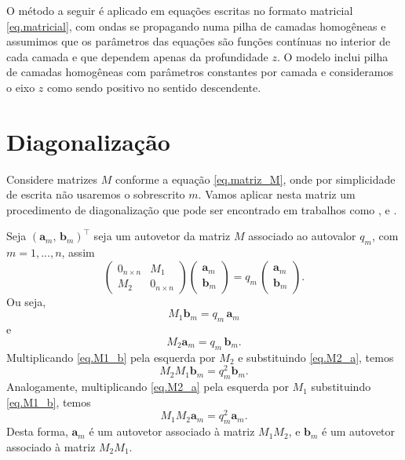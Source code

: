 O m\'etodo a seguir \'e aplicado em equa\c{c}\~oes escritas no formato matricial \ref{eq.matricial}, com ondas se propagando numa pilha de camadas homog\^eneas e assumimos que os par\^ametros das equa\c{c}\~oes s\~ao fun\c{c}\~oes cont\'inuas no interior de cada camada e que dependem apenas da profundidade $z$. O modelo inclui pilha de camadas homog\^eneas com par\^ametros constantes por camada e consideramos o eixo $z$ como sendo positivo no sentido descendente.

\section{Diagonaliza\c{c}\~ao}\label{sec.diagonalizacao}
Considere matrizes $M$ conforme a equa\c{c}\~ao \ref{eq.matriz_M}, onde por simplicidade de escrita n\~ao usaremos o sobrescrito $m$. Vamos aplicar nesta matriz um procedimento de diagonaliza\c{c}\~ao que pode ser encontrado em trabalhos como \cite{Ursin-1983}, \cite{White_Zhou_2006} e \cite{Azeredo_2013}.

Seja $(\mathbf{a}_m,\,\mathbf{b}_m)^\top$ seja um autovetor da matriz $M$ associado ao autovalor $q_m$, com $m=1,...,n$, assim
\begin{equation}
\begin{pmatrix}
0_{n\times n}&M_1\\
M_2&0_{n\times n}
\end{pmatrix}
\begin{pmatrix}
\mathbf{a}_m\\
\mathbf{b}_m
\end{pmatrix}
=
q_m\,
\begin{pmatrix}
\mathbf{a}_m\\
\mathbf{b}_m
\end{pmatrix}.
\end{equation}
Ou seja, 
\begin{equation}\label{eq.M1_b}
M_1\mathbf{b}_m=q_m\,\mathbf{a}_m 
\end{equation}
e
\begin{equation}\label{eq.M2_a}
M_2\mathbf{a}_m=q_m\,\mathbf{b}_m. 
\end{equation}
Multiplicando \ref{eq.M1_b} pela esquerda por $M_2$ e substituindo \ref{eq.M2_a}, temos
\begin{equation}\label{eq.m2m1bm}
M_2M_1\mathbf{b}_m=q_m^2\mathbf{b}_m.
\end{equation} 
Analogamente, multiplicando \ref{eq.M2_a} pela esquerda por $M_1$ substituindo \ref{eq.M1_b}, temos 
\begin{equation}\label{eq.m1m2am}
M_1M_2\mathbf{a}_m=q_m^2\mathbf{a}_m.
\end{equation}
Desta forma, $\mathbf{a}_m$ \'e um autovetor associado \`a matriz $M_1M_2$, e $\mathbf{b}_m$ \'e um autovetor associado \`a matriz $M_2M_1$. 

